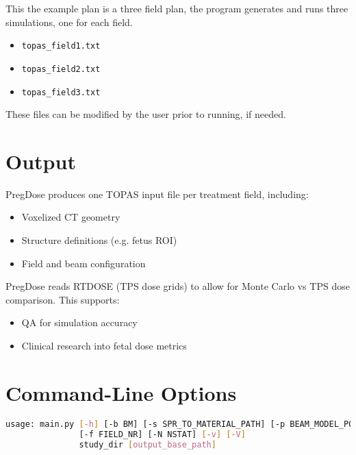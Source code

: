 \documentclass[11pt]{article}
\begin{document}
This the example plan is a three field plan, the program generates and runs three simulations, one for each field.
\begin{itemize}
    \item \texttt{topas\_field1.txt}
    \item \texttt{topas\_field2.txt}
    \item \texttt{topas\_field3.txt}
\end{itemize}

These files can be modified by the user prior to running, if needed.  

\section{Output}

PregDose produces one TOPAS input file per treatment field, including:
\begin{itemize}
    \item Voxelized CT geometry
    \item Structure definitions (e.g. fetus ROI)
    \item Field and beam configuration
\end{itemize}

PregDose reads RTDOSE (TPS dose grids) to allow for Monte Carlo vs TPS dose comparison. This supports:
\begin{itemize}
    \item QA for simulation accuracy
    \item Clinical research into fetal dose metrics
\end{itemize}

\section{Command-Line Options}

\begin{lstlisting}[language=bash]
usage: main.py [-h] [-b BM] [-s SPR_TO_MATERIAL_PATH] [-p BEAM_MODEL_POSITION]
               [-f FIELD_NR] [-N NSTAT] [-v] [-V]
               study_dir [output_base_path]
\end{lstlisting}
\end{document}
